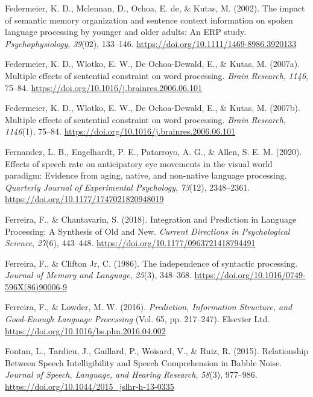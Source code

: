 \documentclass[a4paper, nobind]{templates/ociamthesis}
\newlength{\cslhangindent}
\newenvironment{CSLReferences}[2] %
 {%
  \setlength{\parindent}{0pt}
  \ifodd #1
  \let\oldpar\par
  \def\par{\hangindent=\cslhangindent\oldpar}
  \fi
  \setlength{\parskip}{1mm}
  \setlength{\baselineskip}{6mm}
 }%
 {}
\begin{document}
\begin{CSLReferences}{1}{0}
\leavevmode{}%
Federmeier, K. D., Mclennan, D., Ochoa, E. de, \& Kutas, M. (2002). {The impact of semantic memory organization and sentence context information on spoken language processing by younger and older adults: An ERP study}. \emph{Psychophysiology}, \emph{39}(02), 133--146. \url{https://doi.org/10.1111/1469-8986.3920133}

\leavevmode{}%
Federmeier, K. D., Wlotko, E. W., De Ochoa-Dewald, E., \& Kutas, M. (2007a). Multiple effects of sentential constraint on word processing. \emph{Brain Research}, \emph{1146}, 75--84. \url{https://doi.org/10.1016/j.brainres.2006.06.101}

\leavevmode{}%
Federmeier, K. D., Wlotko, E. W., De Ochoa-Dewald, E., \& Kutas, M. (2007b). {Multiple effects of sentential constraint on word processing}. \emph{Brain Research}, \emph{1146}(1), 75--84. \url{https://doi.org/10.1016/j.brainres.2006.06.101}

\leavevmode{}%
Fernandez, L. B., Engelhardt, P. E., Patarroyo, A. G., \& Allen, S. E. M. (2020). {Effects of speech rate on anticipatory eye movements in the visual world paradigm: Evidence from aging, native, and non-native language processing}. \emph{Quarterly Journal of Experimental Psychology}, \emph{73}(12), 2348--2361. \url{https://doi.org/10.1177/1747021820948019}

\leavevmode{}%
Ferreira, F., \& Chantavarin, S. (2018). {Integration and Prediction in Language Processing: A Synthesis of Old and New}. \emph{Current Directions in Psychological Science}, \emph{27}(6), 443--448. \url{https://doi.org/10.1177/0963721418794491}

\leavevmode{}%
Ferreira, F., \& Clifton Jr, C. (1986). The independence of syntactic processing. \emph{Journal of Memory and Language}, \emph{25}(3), 348--368. \url{https://doi.org/10.1016/0749-596X(86)90006-9}

\leavevmode{}%
Ferreira, F., \& Lowder, M. W. (2016). \emph{{Prediction, Information Structure, and Good-Enough Language Processing}} (Vol. 65, pp. 217--247). Elsevier Ltd. \url{https://doi.org/10.1016/bs.plm.2016.04.002}

\leavevmode{}%
Fontan, L., Tardieu, J., Gaillard, P., Woisard, V., \& Ruiz, R. (2015). Relationship Between Speech Intelligibility and Speech Comprehension in Babble Noise. \emph{Journal of Speech, Language, and Hearing Research}, \emph{58}(3), 977--986. \url{https://doi.org/10.1044/2015_jslhr-h-13-0335}


\end{CSLReferences}
\end{document}

